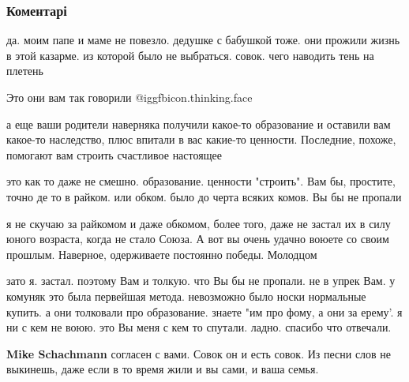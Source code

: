  
 
 
 
 
\subsubsection{Коментарі}

\begin{itemize} %

да. моим папе и маме не повезло. дедушке с бабушкой тоже. они прожили жизнь в
этой казарме. из которой было не выбраться. совок. чего наводить тень на
плетень

\begin{itemize} %
Это они вам так говорили @igg{fbicon.thinking.face} 


а еще ваши родители наверняка получили какое-то образование и оставили вам
какое-то наследство, плюс впитали в вас какие-то ценности. Последние, похоже,
помогают вам строить счастливое настоящее


это как то даже не смешно. образование. ценности "строить". Вам бы, простите,
точно де то в райком. или обком. было до черта всяких комов. Вы бы не пропали


я не скучаю за райкомом и даже обкомом, более того, даже не застал их в силу
юного возраста, когда не стало Союза. А вот вы очень удачно воюете со своим
прошлым. Наверное, одерживаете постоянно победы. Молодцом


зато я. застал. поэтому Вам и толкую. что Вы бы не пропали. не в упрек Вам. у
комуняк это была первейшая метода. невозможно было носки нормальные купить. а
они толковали про образование. знаете "им про фому, а они за ерему'. я ни с кем
не воюю. это Вы меня с кем то спутали. ладно. спасибо что отвечали.

\textbf{Mike Schachmann} согласен с вами. Совок он и есть совок. Из песни слов не выкинешь, даже если в то время жили и вы сами, и ваша семья.


\end{itemize}
\end{itemize}
